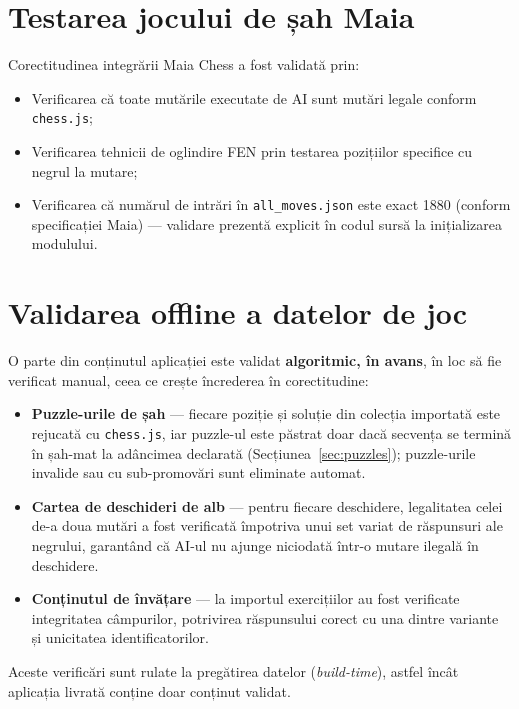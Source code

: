\documentclass[12pt, a4paper, twoside]{report}
\numberwithin{equation}{section}
\begin{document}
\section{Testarea jocului de șah Maia}

Corectitudinea integrării Maia Chess a fost validată prin:
\begin{itemize}
  \item Verificarea că toate mutările executate de AI sunt mutări legale conform
    \texttt{chess.js};
  \item Verificarea tehnicii de oglindire FEN prin testarea pozițiilor specifice cu
    negrul la mutare;
  \item Verificarea că numărul de intrări în \texttt{all\_moves.json} este exact 1880
    (conform specificației Maia) — validare prezentă explicit în codul sursă la
    inițializarea modulului.
\end{itemize}

\section{Validarea offline a datelor de joc}

O parte din conținutul aplicației este validat \textbf{algoritmic, în avans}, în loc să fie
verificat manual, ceea ce crește încrederea în corectitudine:
\begin{itemize}
  \item \textbf{Puzzle-urile de șah} — fiecare poziție și soluție din colecția importată este
    rejucată cu \texttt{chess.js}, iar puzzle-ul este păstrat doar dacă secvența se termină în
    șah-mat la adâncimea declarată (Secțiunea~\ref{sec:puzzles}); puzzle-urile invalide sau cu
    sub-promovări sunt eliminate automat.
  \item \textbf{Cartea de deschideri de alb} — pentru fiecare deschidere, legalitatea celei
    de-a doua mutări a fost verificată împotriva unui set variat de răspunsuri ale negrului,
    garantând că AI-ul nu ajunge niciodată într-o mutare ilegală în deschidere.
  \item \textbf{Conținutul de învățare} — la importul exercițiilor au fost verificate
    integritatea câmpurilor, potrivirea răspunsului corect cu una dintre variante și unicitatea
    identificatorilor.
\end{itemize}
Aceste verificări sunt rulate la pregătirea datelor (\textit{build-time}), astfel încât
aplicația livrată conține doar conținut validat.

\end{document}
